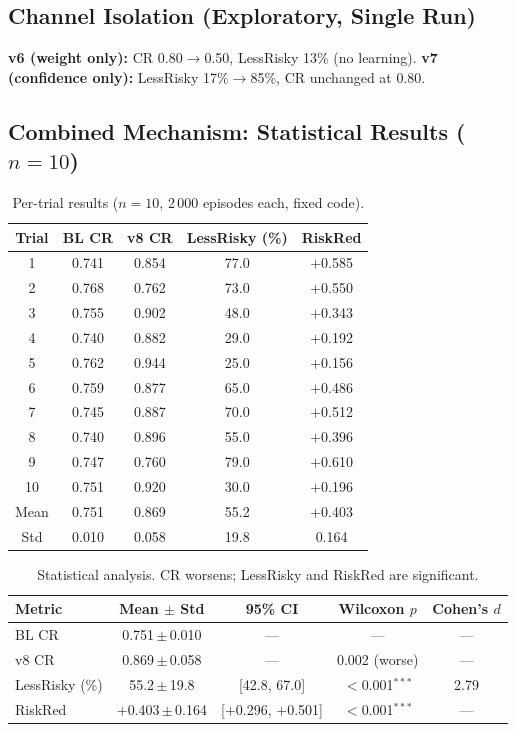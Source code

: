 \documentclass[runningheads]{llncs}
\begin{document}
\subsection{Channel Isolation (Exploratory, Single Run)}

\textbf{v6 (weight only):} CR 0.80$\to$0.50, LessRisky 13\% (no learning). \textbf{v7 (confidence only):} LessRisky 17\%$\to$85\%, CR unchanged at 0.80.

\subsection{Combined Mechanism: Statistical Results ($n{=}10$)}

\begin{table}[H]
\centering
\caption{Per-trial results ($n{=}10$, 2\,000 episodes each, fixed code).}
\label{tab:trials}
\begin{tabular}{ccccc}
\toprule
Trial & BL CR & v8 CR & LessRisky (\%) & RiskRed \\
\midrule
1 & 0.741 & 0.854 & 77.0 & $+$0.585 \\
2 & 0.768 & 0.762 & 73.0 & $+$0.550 \\
3 & 0.755 & 0.902 & 48.0 & $+$0.343 \\
4 & 0.740 & 0.882 & 29.0 & $+$0.192 \\
5 & 0.762 & 0.944 & 25.0 & $+$0.156 \\
6 & 0.759 & 0.877 & 65.0 & $+$0.486 \\
7 & 0.745 & 0.887 & 70.0 & $+$0.512 \\
8 & 0.740 & 0.896 & 55.0 & $+$0.396 \\
9 & 0.747 & 0.760 & 79.0 & $+$0.610 \\
10 & 0.751 & 0.920 & 30.0 & $+$0.196 \\
\midrule
Mean & 0.751 & 0.869 & 55.2 & $+$0.403 \\
Std & 0.010 & 0.058 & 19.8 & 0.164 \\
\bottomrule
\end{tabular}
\end{table}

\begin{table}[H]
\centering
\caption{Statistical analysis. CR worsens; LessRisky and RiskRed are significant.}
\label{tab:stats}
\begin{tabular}{lcccc}
\toprule
Metric & Mean $\pm$ Std & 95\% CI & Wilcoxon $p$ & Cohen's $d$ \\
\midrule
BL CR & 0.751\,$\pm$\,0.010 & --- & --- & --- \\
v8 CR & 0.869\,$\pm$\,0.058 & --- & 0.002 (worse) & --- \\
\midrule
LessRisky (\%) & 55.2\,$\pm$\,19.8 & [42.8, 67.0] & $<$0.001$^{***}$ & 2.79 \\
RiskRed & $+$0.403\,$\pm$\,0.164 & [$+$0.296, $+$0.501] & $<$0.001$^{***}$ & --- \\
\bottomrule
\end{tabular}
\end{table}
\end{document}

